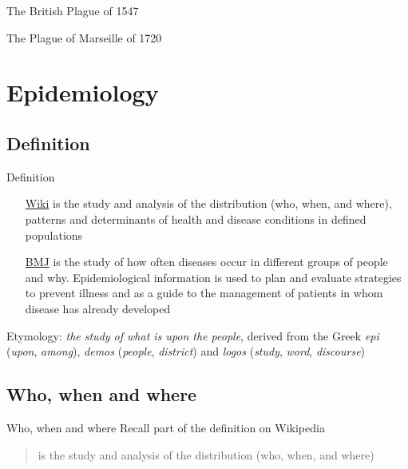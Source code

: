 \documentclass[aspectratio=169]{beamer}\usepackage[]{graphicx}\usepackage[]{xcolor}
\begin{document}
\begin{frame}{The British Plague of 1547}
\end{frame}

\begin{frame}{The Plague of Marseille of 1720}
\end{frame}
\section{Epidemiology}

\subsection{Definition}
\begin{frame}{Definition}

\begin{itemize}
    \item[\href{https://en.wikipedia.org/wiki/Epidemiology}{Wiki}] 
     is the study and analysis of the distribution (who, when, and where), patterns and determinants of health and disease conditions in defined populations
    \item[\href{https://www.bmj.com/about-bmj/resources-readers/publications/epidemiology-uninitiated/1-what-epidemiology}{BMJ}]
     is the study of how often diseases occur in different groups of people and why. Epidemiological information is used to plan and evaluate strategies to prevent illness and as a guide to the management of patients in whom disease has already developed 
\end{itemize}
\vfill
Etymology: \emph{the study of what is upon the people}, derived from the Greek \emph{epi} (\emph{upon}, \emph{among}), \emph{demos} (\emph{people}, \emph{district}) and \emph{logos} (\emph{study}, \emph{word}, \emph{discourse})
\end{frame}

\subsection{Who, when and where}


\begin{frame}{Who, when and where}
Recall part of the definition on Wikipedia
\begin{quote}
 is the study and analysis of the distribution (who, when, and where)  
\end{quote}
\end{frame}
\end{document}
